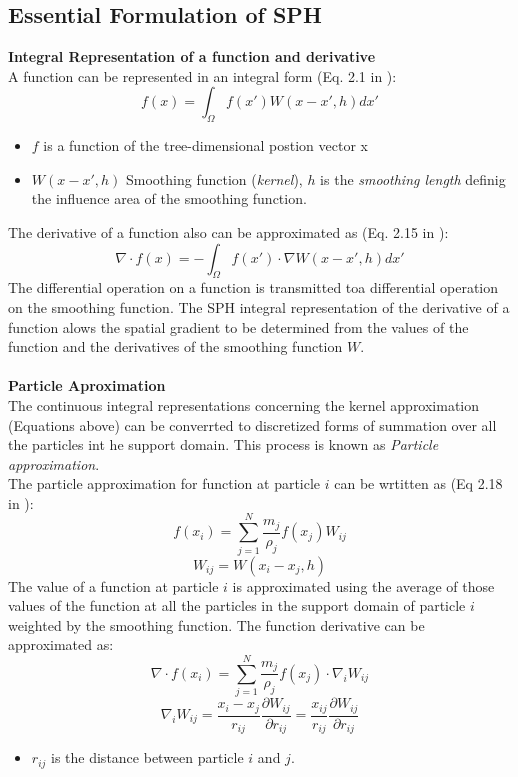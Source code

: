 \documentclass[12pt]{book}
\begin{document}
\subsection{Essential Formulation of SPH}
\textbf{Integral Representation of a function and derivative}\\
A function can be represented in an integral form (Eq. 2.1 in \cite{Liu_SPH}):
\[f(x)=\int_{\Omega}{f(x\prime)W(x-x',h)dx'}\]
\begin{itemize}
\item $f$ is a function of the tree-dimensional postion vector x
\item $W(x-x',h)$ Smoothing function (\textit{kernel}), $h$ is the \textit{smoothing length} definig the influence area of the smoothing function.
\end{itemize}
The derivative of a function also can be approximated as (Eq. 2.15 in \cite{Liu_SPH}):
\[\nabla\cdot f(x)=-\int_{\Omega}{f(x')\cdot\nabla W(x-x',h)dx'}\]
The differential operation on a function is transmitted toa  differential operation on the smoothing function. The SPH integral representation of the derivative of a function alows the spatial gradient to be determined from the values of the function and the derivatives of the smoothing function $W$.\\\\
\textbf{Particle Aproximation}\\
The continuous integral representations concerning the kernel approximation (Equations above) can be converrted to discretized forms of summation over all the particles int he support domain. This process is known as \textit{Particle approximation}.\\
The particle approximation for  function at particle $i$ can be wrtitten as (Eq 2.18 in \cite{Liu_SPH}):
\[f(x_i)=\sum_{j=1}^{N}{\frac{m_j}{\rho_j}f(x_j)W_{ij}}\]
\[W_{ij}=W(x_i-x_j,h)\]
The value of a function at particle $i$ is approximated using the average of those values of the function at all the particles in the support domain of particle $i$ weighted by the smoothing function.
The function derivative can be approximated as:
\[ \nabla\cdot f(x_i)=\sum_{j=1}^{N}{\frac{m_j}{\rho_j}f(x_j)\cdot\nabla_i W_{ij}}\]
\[\nabla_iW_{ij}=\frac{x_i-x_j}{r_{ij}}\frac{\partial W_{ij} }{\partial r_{ij}}=\frac{x_{ij}}{r_{ij}}\frac{\partial W_{ij}}{\partial r_{ij}}\]
\begin{itemize}
\item $r_{ij}$ is the distance between particle $i$ and $j$.
\end{itemize}
\end{document}
